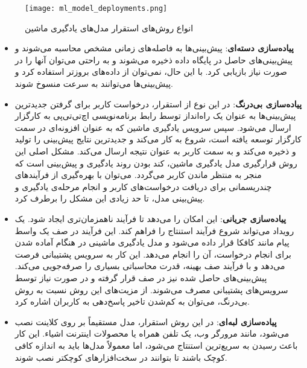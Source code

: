 \begin{figure}[!h]
\centerline{\texttt{[image: ml\_model\_deployments.png]}}
\caption{انواع روش‌های استقرار مدل‌های یادگیری ماشین}
\label{fig:ml_model_deployments}
\end{figure}

\begin{itemize}

\item \textbf{پیاده‌سازی دسته‌ای}: پیش‌بینی‌ها به فاصله‌های زمانی مشخص محاسبه می‌شوند و پیش‌بینی‌های حاصل در پایگاه داده ذخیره می‌شوند و به راحتی می‌توان آنها را در صورت نیاز بازیابی کرد. با این حال، نمی‌توان از داده‌های بروزتر استفاده کرد و پیش‌بینی‌ها می‌توانند به سرعت منسوخ شوند\cite{singh2021deploy, pacheco2018towards}.

\item \textbf{پیاده‌سازی بی‌درنگ}: در این نوع از استقرار، درخواست کاربر برای گرفتن جدید‌ترین پیش‌بینی‌ها به عنوان یک راه‌انداز توسط رابط برنامه‌نویسی اچ‌تی‌تی‌پی به کارگزار ارسال می‌شود. سپس سرویس یادگیری ماشین که به عنوان افزونه‌ای در سمت کارگزار توسعه یافته است، شروع به کار می‌کند و جدیدترین نتایج پیش‌بینی را تولید و ذخیره می‌کند و به سمت کاربر به عنوان نتیجه ارسال می‌کند. مشکل اصلی این روش قرارگیری مدل یادگیری ماشین، کند بودن روند یادگیری و پیش‌بینی است که منجر به منتظر ماندن کاربر می‌گردد. می‌توان با بهره‌گیری از فرآیند‌های چندریسمانی برای دریافت درخواست‌های کاربر و انجام مرحله‌ی یادگیری و پیش‌بینی مدل، تا حد زیادی این مشکل را برطرف کرد\cite{singh2021deploy, pacheco2018towards}.

\item \textbf{پیاده‌سازی جریانی}: این امکان را می‌دهد تا فرآیند ناهمزمان‌تری ایجاد شود. یک رویداد می‌تواند شروع فرآیند استنتاج را فراهم کند. این فرآیند در صف یک واسط پیام مانند کافکا قرار داده می‌شود و مدل یادگیری ماشینی در هنگام آماده شدن برای انجام درخواست، آن را انجام می‌دهد. این کار به سرویس پشتیبانی فرصت می‌دهد و با فرآیند صف بهینه، قدرت محاسباتی بسیاری را صرفه‌جویی می‌کند. پیش‌بینی‌های حاصل شده نیز در صف قرار گرفته و در صورت نیاز توسط سرویس‌های پشتیبانی مصرف می‌شوند. از مزیت‌های این روش نسبت به روش بی‌درنگ، می‌توان به کم‌شدن تاخیر پاسخ‌دهی به کاربران اشاره کرد\cite{singh2021deploy, pacheco2018towards}.

\item \textbf{پیاده‌سازی لبه‌ای}: در این روش استقرار، مدل مستقیماً بر روی کلاینت نصب می‌شود، مانند مرورگر وب، یک تلفن همراه یا محصولات اینترنت اشیاء. این کار باعث رسیدن به سریع‌ترین استنتاج می‌شود، اما معمولاً مدل‌ها باید به اندازه کافی کوچک باشند تا بتوانند در سخت‌افزارهای کوچکتر نصب شوند\cite{kaggleMLdeployments}.

\end{itemize}

